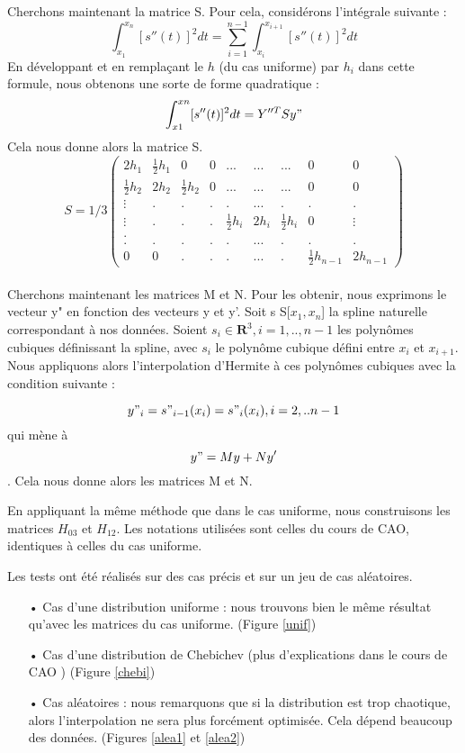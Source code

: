 \documentclass[a4paper,12pt]{article} %
\begin{document}
                Cherchons maintenant la matrice S. Pour cela, considérons l'intégrale suivante : \\
                $$\int_{x_1}^{x_n}[s''(t)]^2dt=\sum_{i=1}^{n-1}\int_{x_i}^{x_{i+1}}[s''(t)]^2dt$$
                En développant et en remplaçant le $h$ (du cas uniforme) par $h_i$ dans cette formule, nous obtenons une sorte de forme quadratique : $$\int_{x1}^{xn}[s''(t)]^2dt= Y''^T S y"$$
                Cela nous donne alors la matrice S. 
                $$S=1/3\begin{pmatrix} 2h_1&\frac{1}{2}h_1&0&0&...&...&...&0&0 \\ \frac{1}{2}h_2&2h_2&\frac{1}{2}h_2&0&...&...&...&0&0 \\ \vdots&.&.&.&.&...&.&.&.\\ \vdots&.&.&.&\frac{1}{2}h_i&2h_i&\frac{1}{2}h_i&0&\vdots \\. \\.&.&.&.&.&...&.&.&. \\ 0&0&.&.&.&...&.&\frac{1}{2}h_{n-1}&2h_{n-1} \end{pmatrix}$$\\
                
                Cherchons maintenant les matrices M et N. Pour les obtenir, nous exprimons le vecteur y" en fonction des  vecteurs y et y'. Soit s \in S[$x_1,x_n$] la spline naturelle correspondant à nos données. Soient $s_i \in \textbf{R}^3,i=1,..,n-1$ les polynômes cubiques définissant la spline, avec $s_i$ le polynôme cubique défini entre $x_i$ et $x_{i+1}$. Nous appliquons alors l'interpolation d'Hermite à ces polynômes cubiques avec la condition suivante :
                
                $$y"_i=s"_{i-1}(x_i)=s"_i(x_i), i=2,..n-1$$
                qui mène à $$y"=My+Ny'$$. Cela nous donne alors les matrices M et N.
                
                
                En appliquant la même méthode que dans le cas uniforme, nous construisons les matrices $H_{03}$ et $H_{12}$. Les notations utilisées sont celles du cours de CAO, identiques à celles du cas uniforme.
               
    			Les tests ont été réalisés sur des cas précis et sur un jeu de cas aléatoires.
    
                \begin{itemize}
                \item[•] Cas d'une distribution uniforme : nous trouvons bien le même résultat qu'avec les matrices du cas uniforme. (Figure \ref{unif})
                \item[•] Cas d'une distribution de Chebichev (plus d'explications dans le cours de CAO \cite{CAO_lissage}) (Figure \ref{chebi})
                \item[•] Cas aléatoires : nous remarquons que si la distribution est trop chaotique, alors l'interpolation ne sera plus forcément optimisée. Cela dépend beaucoup des données. (Figures \ref{alea1} et \ref{alea2})
                \end{itemize}
                
\end{document}
